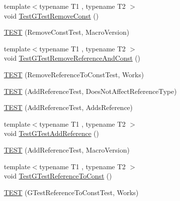 \begin{DoxyCompactItemize}
\item 
{\footnotesize template$<$typename T1 , typename T2 $>$ }\\void \mbox{\hyperlink{_obj__test_2lib_2googletest-master_2googletest_2test_2gtest__unittest_8cc_a925cffc2731cce684bfcd82858eac00b}{Test\+G\+Test\+Remove\+Const}} ()
\item 
\mbox{\hyperlink{_obj__test_2lib_2googletest-master_2googletest_2test_2gtest__unittest_8cc_a9fd89b0957e416c98f52e2c44196bb29}{T\+E\+ST}} (Remove\+Const\+Test, Macro\+Version)
\item 
{\footnotesize template$<$typename T1 , typename T2 $>$ }\\void \mbox{\hyperlink{_obj__test_2lib_2googletest-master_2googletest_2test_2gtest__unittest_8cc_af4e9d28ffb149f2bce37f0883cece0ba}{Test\+G\+Test\+Remove\+Reference\+And\+Const}} ()
\item 
\mbox{\hyperlink{_obj__test_2lib_2googletest-master_2googletest_2test_2gtest__unittest_8cc_af57c5701311c2e9074540ee680e3f34e}{T\+E\+ST}} (Remove\+Reference\+To\+Const\+Test, Works)
\item 
\mbox{\hyperlink{_obj__test_2lib_2googletest-master_2googletest_2test_2gtest__unittest_8cc_ac910b493f212cc393ec0a34310fd6072}{T\+E\+ST}} (Add\+Reference\+Test, Does\+Not\+Affect\+Reference\+Type)
\item 
\mbox{\hyperlink{_obj__test_2lib_2googletest-master_2googletest_2test_2gtest__unittest_8cc_a79f243d73454356cbce420cb627f2a51}{T\+E\+ST}} (Add\+Reference\+Test, Adds\+Reference)
\item 
{\footnotesize template$<$typename T1 , typename T2 $>$ }\\void \mbox{\hyperlink{_obj__test_2lib_2googletest-master_2googletest_2test_2gtest__unittest_8cc_a9c06f3b08ad59c7dff62b7680a307ed1}{Test\+G\+Test\+Add\+Reference}} ()
\item 
\mbox{\hyperlink{_obj__test_2lib_2googletest-master_2googletest_2test_2gtest__unittest_8cc_a62b3c6edec9e43200fe9cce9a520f90e}{T\+E\+ST}} (Add\+Reference\+Test, Macro\+Version)
\item 
{\footnotesize template$<$typename T1 , typename T2 $>$ }\\void \mbox{\hyperlink{_obj__test_2lib_2googletest-master_2googletest_2test_2gtest__unittest_8cc_a033ae0af50f62e72a31bf1a28151bd65}{Test\+G\+Test\+Reference\+To\+Const}} ()
\item 
\mbox{\hyperlink{_obj__test_2lib_2googletest-master_2googletest_2test_2gtest__unittest_8cc_a69fa334ed4d6f74b62d2404b65ae7852}{T\+E\+ST}} (G\+Test\+Reference\+To\+Const\+Test, Works)

\end{DoxyCompactItemize}
